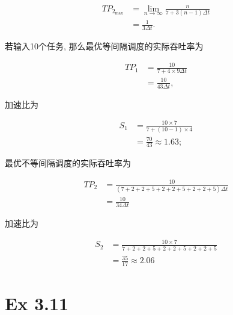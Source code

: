 \begin{solve}
  \begin{align*}
    TP_{2_{\mathrm{max}}} &=
    \lim_{n\rightarrow{}\infty}{\frac{n}{7+3(n-1)\Delta{}t}}\\
    &=\frac{1}{3\Delta{}t}.
  \end{align*}

  若输入10个任务, 那么最优等间隔调度的实际吞吐率为
  
  \begin{align*}
    TP_1 &= \frac{10}{7+4\times{}9 \Delta{}t}\\
    &= \frac{10}{43\Delta{}t},
  \end{align*}

  加速比为

  \begin{align*}
    S_1 &= \frac{10\times{}7}{7+(10-1) \times{} 4}\\
    &= \frac{70}{43} \approx 1.63;
  \end{align*}

  最优不等间隔调度的实际吞吐率为
  
  \begin{align*}
    TP_2 &= \frac{10}{(7+2+2+5+2+2+5+2+2+5)\Delta{}t}\\
    &= \frac{10}{34\Delta{}t} 
  \end{align*}

  加速比为

  \begin{align*}
    S_2 &= \frac{10\times{}7}{7+2+2+5+2+2+5+2+2+5}\\
    &= \frac{35}{17} \approx 2.06
  \end{align*}
\end{solve}

\section{Ex 3.11}

